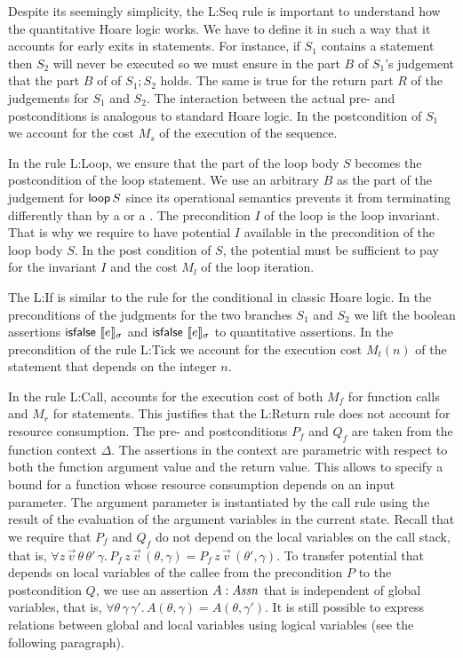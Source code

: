 \documentclass[nocopyrightspace,preprint]{sigplanconf}
\begin{document}
Despite its seemingly simplicity, the {\sc L:Seq} rule is important to
understand how the quantitative Hoare logic works.  We have to define
it in such a way that it accounts for early exits in statements. For
instance, if $S_1$ contains a  statement then $S_2$ will
never be executed so we must ensure in the  part $B$ of
$S_1$'s judgement that the  part $B$ of of $S_1;S_2$
holds. The same is true for the return part $R$ of the judgements for
$S_1$ and $S_2$.  The interaction between the actual pre- and
postconditions is analogous to standard Hoare logic.  In the
postcondition of $S_1$ we account for the cost $M_s$ of the execution
of the sequence.

In the rule {\sc L:Loop}, we ensure that the  part of the
loop body $S$ becomes the postcondition of the loop statement. We use
an arbitrary $B$ as the  part of the judgement for
$\mathsf{loop}\, S$ since its operational semantics prevents it from
terminating differently than by a  or a .  The
precondition $I$ of the loop is the loop invariant.  That is why we
require to have potential $I$ available in the precondition of the
loop body $S$.  In the post condition of $S$, the potential must be
sufficient to pay for the invariant $I$ and the cost $M_l$ of the loop
iteration.

The {\sc L:If} is similar to the rule for the conditional in classic
Hoare logic.  In the preconditions of the judgments for the two
branches $S_1$ and $S_2$ we lift the boolean assertions
$\mathsf{isfalse}~\llbracket e \rrbracket_{\sigma}$ and $\mathsf{isfalse}~\llbracket e \rrbracket_{\sigma}$ to
quantitative assertions.  In the precondition of the rule {\sc L:Tick}
we account for the execution cost $M_t(n)$ of the 
statement that depends on the integer $n$.

In the rule {\sc L:Call}, accounts for the execution cost of both
$M_f$ for function calls and $M_r$ for  statements.  This
justifies that the {\sc L:Return} rule does not account for resource
consumption.  The pre- and postconditions $P_f$ and $Q_f$ are taken
from the function context $\Delta$.  The assertions in the context are
parametric with respect to both the function argument value and the
return value. This allows to specify a bound for a function whose
resource consumption depends on an input parameter.  The argument
parameter is instantiated by the call rule using the result of the
evaluation of the argument variables in the current state.  Recall
that we require that $P_f$ and $Q_f$ do not depend on the local
variables on the call stack, that is, $\forall z \, \vec v \, \theta
\, \theta' \, \gamma . \, P_f \, z \, \vec v \, (\theta,\gamma) = P_f
\, z \, \vec v \, (\theta',\gamma)$.  To transfer potential that
depends on local variables of the callee from the precondition $P$ to
the postcondition $Q$, we use an assertion $A : \mathit{Assn}$ that is
independent of global variables, that is, $\forall \theta \, \gamma \,
\gamma' . \, A (\theta,\gamma) = A(\theta,\gamma')$.  It is still
possible to express relations between global and local variables using
logical variables (see the following paragraph).
\end{document}
